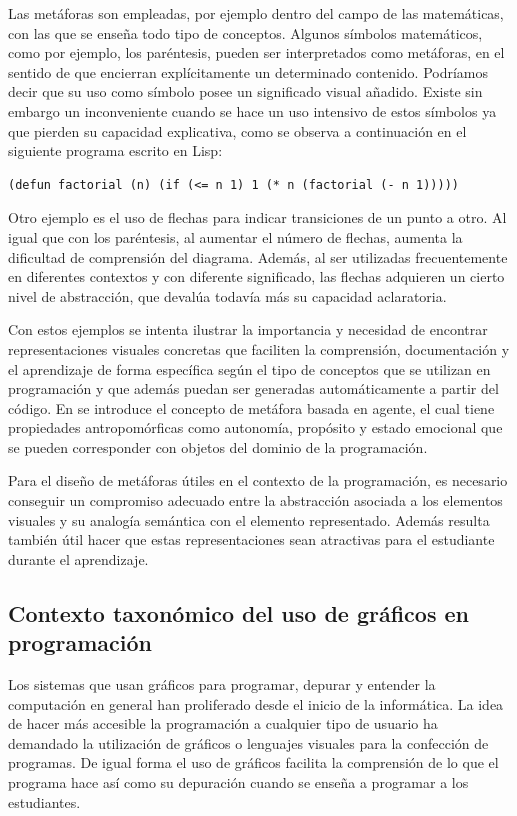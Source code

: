 \documentclass{llncs}
\begin{document}
Las metáforas son empleadas, por ejemplo dentro del campo de las matemáticas, con las que se enseña todo tipo de conceptos. Algunos símbolos matemáticos, como por ejemplo, los paréntesis, pueden ser interpretados como metáforas, en el sentido de que encierran explícitamente un determinado contenido. Podríamos decir que su uso como símbolo posee un significado visual añadido. Existe sin embargo un inconveniente cuando se hace un uso intensivo de estos símbolos ya que pierden su capacidad explicativa, como se observa a continuación en el siguiente programa escrito en Lisp:

\begin{verbatim}
(defun factorial (n) (if (<= n 1) 1 (* n (factorial (- n 1)))))
\end{verbatim}

Otro ejemplo es el uso de flechas para indicar transiciones de un punto a otro. Al igual que con los paréntesis, al aumentar el número de flechas, aumenta la dificultad de comprensión del diagrama. Además, al ser utilizadas frecuentemente en diferentes contextos y con diferente significado, las flechas adquieren un cierto nivel de abstracción, que devalúa todavía más su capacidad aclaratoria. 

Con estos ejemplos se intenta ilustrar la importancia y necesidad de encontrar representaciones visuales concretas que faciliten la comprensión, documentación y el aprendizaje de forma específica según el tipo de conceptos que se utilizan en programación y que además puedan ser generadas automáticamente a partir del código. En \cite{travers1996programming} se introduce el concepto de metáfora basada en agente, el cual tiene propiedades antropomórficas como autonomía, propósito y estado emocional que se pueden corresponder con objetos del dominio de la programación.

Para el diseño de metáforas útiles en el contexto de la programación, es necesario conseguir un compromiso adecuado entre la abstracción asociada a los elementos visuales y su analogía semántica con el elemento representado. Además resulta también útil hacer que estas representaciones sean atractivas para el estudiante durante el aprendizaje. 


\subsection{Contexto taxonómico del uso de gráficos en programación}
\label{subsec:taxonomy}
Los sistemas que usan gráficos para programar, depurar y entender la computación en general han proliferado desde el inicio de la informática. La idea de hacer más accesible la programación a cualquier tipo de usuario ha demandado la utilización de gráficos o lenguajes visuales para la confección de programas. De igual forma el uso de gráficos facilita la comprensión de lo que el programa hace así como su depuración cuando se enseña a programar a los estudiantes. 
\end{document}
